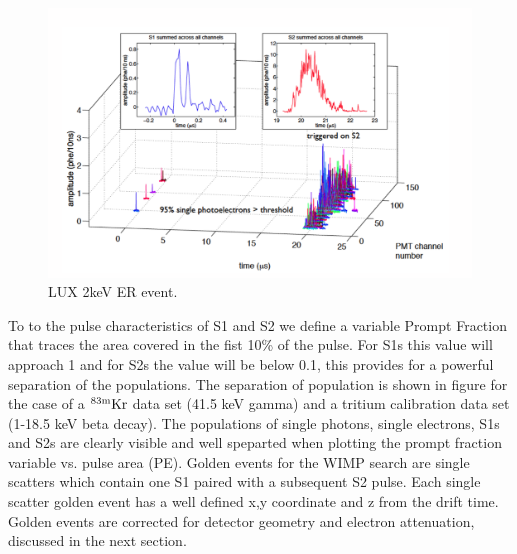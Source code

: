 
 \begin{figure}[h!]\centering
\includegraphics[width=150mm]{Chapter_LUX_Det/LUX_Golden_Event_2keV.png}
\caption{LUX 2keV ER event.}
\label{fig:LUX_Golden}
\end{figure}

To to the pulse characteristics of S1 and S2 we define a variable Prompt Fraction that traces the area covered in the fist 10\% of the pulse. For S1s this value will approach 1 and for S2s the value will be below 0.1, this provides for a powerful separation of the populations. The separation of population is shown in figure for the case of a $\rm ^{83m}Kr$ data set (41.5 keV gamma) and a tritium calibration data set (1-18.5 keV beta decay). The populations of single photons, single electrons, S1s and S2s are clearly visible and well speparted when plotting the prompt  fraction variable vs. pulse area (PE). Golden events for the WIMP search are single scatters which contain one S1 paired with a subsequent S2 pulse. Each single scatter golden event has a well defined x,y coordinate and z from the drift time. Golden events are corrected for detector geometry and electron attenuation, discussed in the next section.


